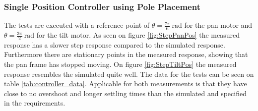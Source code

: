\documentclass[../../main.tex]{subfiles}
\begin{document}
\subsubsection*{Single Position Controller using Pole Placement}
The tests are executed with a reference point of $\theta = \frac{7\pi}{6}\SI{}{\radian}$ for the pan motor and $\theta = \frac{3\pi}{2}\SI{}{\radian}$ for the tilt motor. As seen on figure \ref{fig:StepPanPos} the measured response has a slower step response compared to the simulated response. Furthermore there are stationary points in the measured response, showing that the pan frame has stopped moving. On figure \ref{fig:StepTiltPos} the measured response resembles the simulated quite well. The data for the tests can be seen on table \ref{tab:controller_data}. Applicable for both measurements is that they have close to no overshoot and longer settling times than the simulated and specified in the requirements. 
\end{document}
